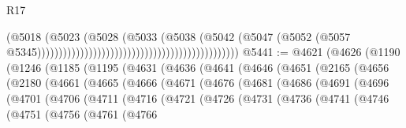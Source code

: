 \begin{lexlean}{R17}
\begin{coremodule}
                                                                                (@5018
                                                                                  (@5023
                                                                                    (@5028
                                                                                      (@5033
                                                                                        (@5038
                                                                                          (@5042
                                                                                            (@5047
                                                                                              (@5052
                                                                                                (@5057
                                                                                                  @5345)))))))))))))))))))))))))))))))))))))))))))))))
@5441 := @4621
    (@4626
      (@1190
        (@1246
          (@1185
            (@1195
              (@4631
                (@4636
                  (@4641
                    (@4646
                      (@4651
                        (@2165
                          (@4656
                            (@2180
                              (@4661
                                (@4665
                                  (@4666
                                    (@4671
                                      (@4676
                                        (@4681
                                          (@4686
                                            (@4691
                                              (@4696
                                                (@4701
                                                  (@4706
                                                    (@4711
                                                      (@4716
                                                        (@4721
                                                          (@4726
                                                            (@4731
                                                              (@4736
                                                                (@4741
                                                                  (@4746
                                                                    (@4751
                                                                      (@4756
                                                                        (@4761
                                                                          (@4766

\end{coremodule}
\end{lexlean}
